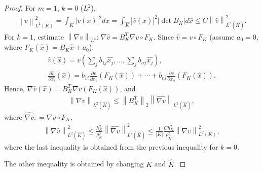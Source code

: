 \documentclass[11pt,a4paper,center,notitlepage]{article}
\numberwithin{equation}{section}
\begin{document}
\begin{proof}
For $m=1$, $k=0$ ($L^2$),
\begin{align}
\left\| v \right\|_{{L^2}\left( K \right)}^2 = \int_K {{{\left| {v\left( x \right)} \right|}^2}dx}  = \int_{\widehat K} {{{\left| {\widehat v\left( {\widehat x} \right)} \right|}^2}\left| {\det {B_K}} \right|d\widehat x}  \le C\left\| {\widehat v} \right\|_{{L^2}\left( {\widehat K} \right)}^2.
\end{align}
For $k=1$, estimate ${\left\| {\nabla v} \right\|_{{L^2}}}$: $\nabla \widehat v = B_K^T\nabla v \circ {F_K}$. Since $\widehat v = v \circ {F_K}$ (assume $a_0=0$, where ${F_K}\left( {\widehat x} \right) = {B_K}\widehat x + {a_0}$),
\begin{align}
\widehat v\left( {\widehat x} \right) = v\left( {\sum\limits_j {{b_{1j}}\widehat {{x_j}}} , \ldots ,\sum\limits_j {{b_{nj}}\widehat {{x_j}}} } \right),\\
\frac{{\partial \widehat v}}{{\partial \widehat {{x_i}}}}\left( {\widehat x} \right) = {b_{1i}}\frac{{\partial v}}{{\partial {x_1}}}\left( {{F_K}\left( {\widehat x} \right)} \right) +  \cdots  + {b_{ni}}\frac{{\partial v}}{{\partial {x_n}}}\left( {{F_K}\left( {\widehat x} \right)} \right).
\end{align}
Hence, $\nabla \widehat v\left( {\widehat x} \right) = B_K^T\nabla v\left( {{F_K}\left( {\widehat x} \right)} \right)$, and
\begin{align}
{\left\| {\nabla \widehat v} \right\|_{{L^2}\left( {\widehat K} \right)}} \le {\left\| {B_K^T} \right\|_2}{\left\| {\widehat {\nabla v}} \right\|_{{L^2}\left( {\widehat K} \right)}} ,
\end{align}
where $\widehat {\nabla v}: = \nabla v \circ {F_K}$.
\begin{align}
\left\| {\nabla \widehat v} \right\|_{{L^2}\left( {\widehat K} \right)}^2 \le \frac{{h_K^2}}{{\rho _K^2}}\left\| {\widehat {\nabla v}} \right\|_{{L^2}\left( {\widehat K} \right)}^2 \le \frac{1}{{\left| K \right|}}\frac{{Ch_K^2}}{{\rho _{\widehat K}^2}}\left\| {\nabla v} \right\|_{{L^2}\left( K \right)}^2,
\end{align}
where the last inequality is obtained from the previous inequality for $k=0$.

The other inequality is obtained by changing $K$ and $\widehat{K}$.
\end{proof}
\end{document}
